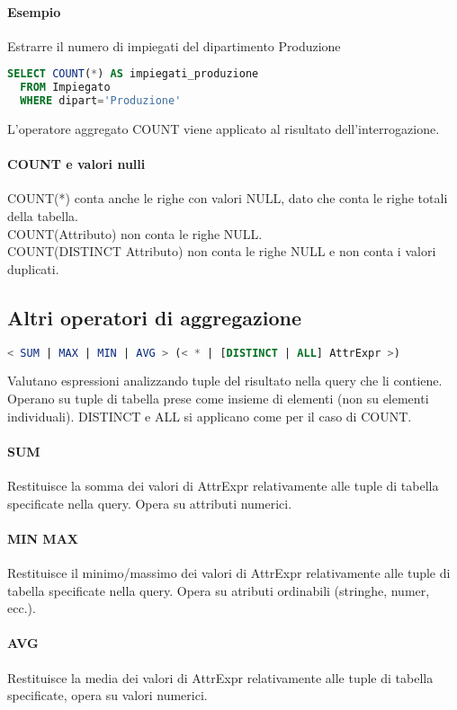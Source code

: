 \paragraph*{Esempio} Estrarre il numero di impiegati del dipartimento Produzione
\begin{lstlisting}[language=SQL]
  SELECT COUNT(*) AS impiegati_produzione
  FROM Impiegato
  WHERE dipart='Produzione'
\end{lstlisting}
L'operatore aggregato COUNT viene applicato al risultato dell'interrogazione.\\
\paragraph*{COUNT e valori nulli}
COUNT(*) conta anche le righe con valori NULL, dato che conta le righe totali della tabella.\\
COUNT(Attributo) non conta le righe NULL.\\
COUNT(DISTINCT Attributo) non conta le righe NULL e non conta i valori duplicati.
\subsection{Altri operatori di aggregazione}
\begin{lstlisting}[language=SQL]
  < SUM | MAX | MIN | AVG > (< * | [DISTINCT | ALL] AttrExpr >)
\end{lstlisting}
Valutano espressioni analizzando tuple del risultato nella query che li contiene. Operano
su tuple di tabella prese come insieme di elementi (non su elementi individuali).
DISTINCT e ALL si applicano come per il caso di COUNT.
\paragraph*{SUM} Restituisce la somma dei valori di AttrExpr relativamente alle tuple di tabella specificate
nella query. Opera su attributi numerici.
\paragraph*{MIN MAX} Restituisce il minimo/massimo dei valori di AttrExpr relativamente alle tuple di tabella 
specificate nella query. Opera su atributi ordinabili (stringhe, numer, ecc.).\\
\paragraph*{AVG} Restituisce la media dei valori di AttrExpr relativamente alle tuple di tabella specificate, opera
su valori numerici.
